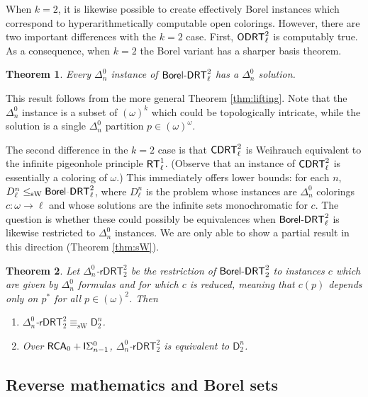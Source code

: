 \documentclass{amsart}
\newtheorem{thm}{Theorem}[section]
\theoremstyle{definition}
\theoremstyle{remark}
\newcommand{\system}[1]{\mbox{\fontfamily{cmss}\fontshape{n}\fontseries{m}%
    \selectfont#1}}
\newcommand{\RCA}{\system{RCA}\ensuremath{_0}}
\newcommand{\RT}{\system{RT}}
\newcommand{\BoDRT}{\system{Borel-DRT}}
\newcommand{\CDRT}{\system{CDRT}}
\newcommand{\ODRT}{\system{ODRT}}
\begin{document}
When $k=2$, it is likewise possible to create effectively Borel instances
which correspond to hyperarithmetically computable open
colorings.  However, there are two important differences with 
the $k=2$ case.  First, $\ODRT^2_\ell$ is computably true.  
As a consequence, when $k=2$ the Borel variant has
a sharper basis theorem.
\begin{thm}Every $\Delta^0_n$ instance of $\BoDRT^2_\ell$ has a 
$\Delta^0_n$ solution.
\end{thm}
 This result follows from the more general Theorem \ref{thm:lifting}.
Note that the $\Delta^0_n$ instance is a subset of $(\omega)^k$ which
could be topologically intricate, while the solution is a single
$\Delta^0_n$ partition $p \in (\omega)^\omega$.

The second difference in the $k=2$ case is that $\CDRT^2_\ell$ 
is Weihrauch equivalent to the infinite pigeonhole principle $\RT^1_\ell$.
(Observe that an instance of $\CDRT^2_\ell$ is essentially 
a coloring of $\omega$.)  This immediately offers lower bounds:
for each $n$,
$D^n_\ell \leq_{\mathrm{sW}} \BoDRT^2_\ell$, where $D^n_\ell$ 
is the problem whose instances are $\Delta^0_n$ colorings 
$c:\omega\rightarrow \ell$ and whose solutions are the infinite 
sets monochromatic for $c$.  The question is whether these 
could possibly be equivalences when $\BoDRT^2_\ell$ is
likewise restricted to $\Delta^0_n$ instances.  We are 
only able to show a partial result in this direction (Theorem \ref{thm:sW}).

\begin{thm}
Let $\Delta^0_n$-$\mathsf{rDRT}^2_2$ be the restriction of $\BoDRT^2_2$
to instances $c$ which are given by $\Delta^0_n$ formulas 
and for which $c$ is \emph{reduced}, meaning that $c(p)$ 
depends only on $p^\ast$ for all $p\in(\omega)^2$.  Then
\begin{enumerate}
\item $\Delta^0_n$-$\mathsf{rDRT}^2_2 \equiv_{\mathrm{sW}} \mathsf{D}^n_2$.
		\item Over $\RCA + \mathsf{I}\Sigma^0_{n-1}$, $\Delta^0_n$-$\mathsf{rDRT}^2_2$ is equivalent to $\mathsf{D}^n_2$.  
\end{enumerate}
\end{thm}


\subsection{Reverse mathematics and Borel sets}
\end{document}
